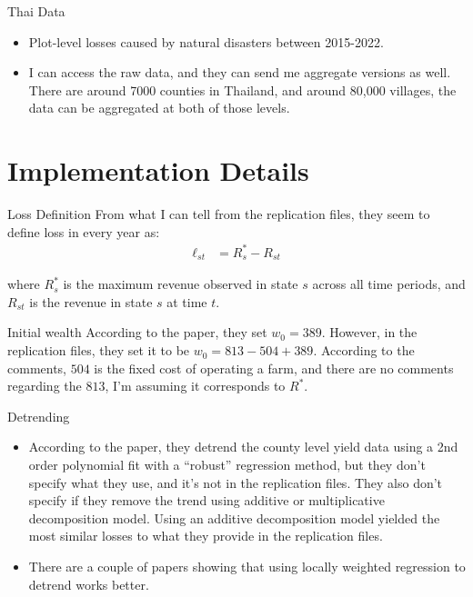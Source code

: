 \documentclass{beamer}
\begin{document}
\begin{frame}{Thai Data}
    \begin{itemize}
        \item Plot-level losses caused by natural disasters between 2015-2022. 
        \item I can access the raw data, and they can send me aggregate versions as well. There are around 7000 counties in Thailand, and around 80,000 villages, the data can be aggregated at both of those levels. 
    \end{itemize}
    
\end{frame}

\section*{Implementation Details}
\begin{frame}{Loss Definition}
    From what I can tell from the replication files, they seem to define loss in every year as: 
    \begin{align*}
        \ell_{st} &= R^*_s - R_{st}
    \end{align*}

    where $R^*_s$ is the maximum revenue observed in state $s$ across all time periods, and $R_{st}$ is the revenue in state $s$ at time $t$. 
\end{frame}

\begin{frame}{Initial wealth}
    According to the paper, they set $w_0 = 389$. However, in the replication files, they set it to be $w_0 = 813 - 504 + 389$. According to the comments, $504$ is the fixed cost of operating a farm, and there are no comments regarding the $813$, I'm assuming it corresponds to $R^*$. 
\end{frame}

\begin{frame}{Detrending}
    \begin{itemize}
        \item According to the paper, they detrend the county level yield data using a 2nd order polynomial fit with a ``robust'' regression method, but they don't specify what they use, and it's not in the replication files. They also don't specify if they remove the trend using additive or multiplicative decomposition model. Using an additive decomposition model yielded the most similar losses to what they provide in the replication files. 
        \item There are a couple of papers showing that using locally weighted regression to detrend works better. 
    \end{itemize}
    
\end{frame}
\end{document}
